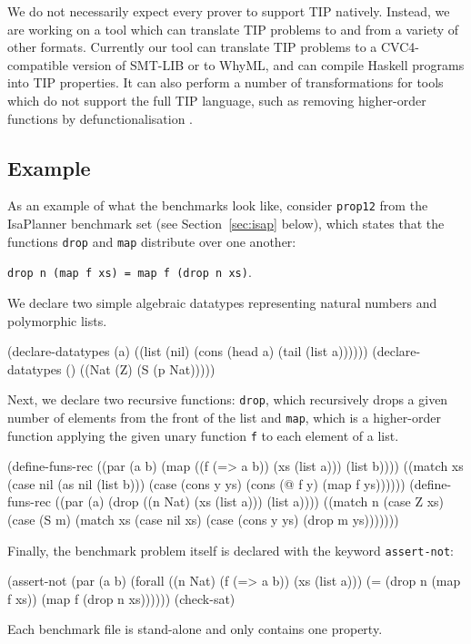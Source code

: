 \documentclass{llncs}
\begin{document}
We do not necessarily expect every prover to support TIP natively.
Instead, we are working on a tool which can translate TIP problems to
and from a variety of other formats. Currently our tool can translate
TIP problems to a CVC4-compatible version of SMT-LIB or to WhyML, and
can compile Haskell programs into TIP properties. It can also perform
a number of transformations for tools which do not support the full
TIP language, such as removing higher-order functions by
defunctionalisation \cite{defunc}.

\subsection*{Example}
As an example of what the benchmarks look like, consider \texttt{prop12} from the IsaPlanner benchmark set (see Section~\ref{sec:isap} below), which states that the functions \texttt{drop} and \texttt{map} distribute over one another: \begin{center} \texttt{drop n (map f xs) = map f (drop n xs)}.\end{center}
We declare two simple algebraic datatypes representing natural numbers and polymorphic lists.

\begin{code}
(declare-datatypes (a)
  ((list (nil) (cons (head a) (tail (list a))))))
(declare-datatypes () ((Nat (Z) (S (p Nat)))))
\end{code}

Next, we declare two recursive functions: \texttt{drop}, which recursively drops a given number of elements from the front of the list and \texttt{map}, which is a higher-order function applying the given unary function \texttt{f} to each element of a list.

\begin{code}
(define-funs-rec
  ((par (a b) (map ((f (=> a b)) (xs (list a))) (list b))))
  ((match xs
     (case nil (as nil (list b)))
     (case (cons y ys) (cons (@ f y) (map f ys))))))
(define-funs-rec
  ((par (a) (drop ((n Nat) (xs (list a))) (list a))))
  ((match n
     (case Z xs)
     (case (S m)
       (match xs
         (case nil xs)
         (case (cons y ys) (drop m ys)))))))
\end{code}

Finally, the benchmark problem itself is declared with the keyword \texttt{assert-not}:

\begin{code}
(assert-not
  (par (a b)
    (forall ((n Nat) (f (=> a b)) (xs (list a)))
      (= (drop n (map f xs)) (map f (drop n xs))))))
(check-sat)
\end{code}
Each benchmark file is stand-alone and only contains one property.
\end{document}
